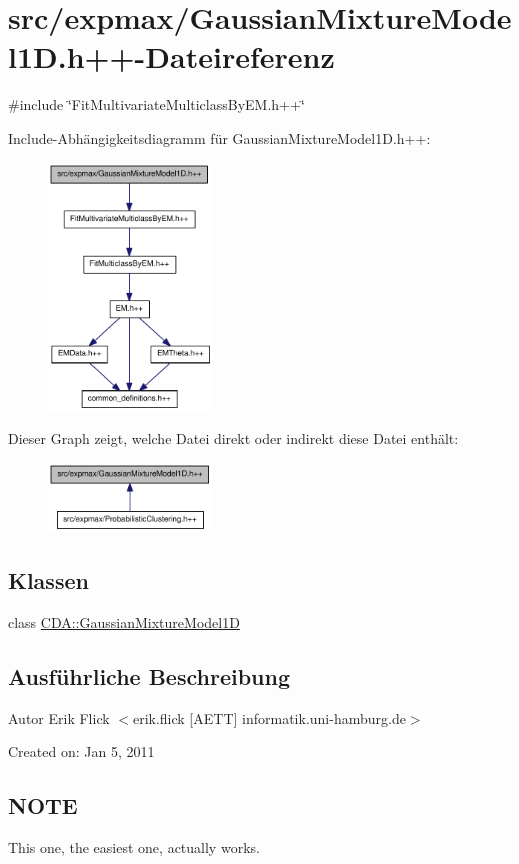 \hypertarget{GaussianMixtureModel1D_8h_09_09}{
\section{src/expmax/GaussianMixtureModel1D.h++-\/Dateireferenz}
\label{GaussianMixtureModel1D_8h_09_09}
}
{\ttfamily \#include \char`\"{}FitMultivariateMulticlassByEM.h++\char`\"{}}\par
Include-\/Abhängigkeitsdiagramm für GaussianMixtureModel1D.h++:\nopagebreak
\begin{figure}[H]
\begin{center}
\leavevmode
\includegraphics[width=124pt]{GaussianMixtureModel1D_8h_09_09__incl}
\end{center}
\end{figure}
Dieser Graph zeigt, welche Datei direkt oder indirekt diese Datei enthält:\nopagebreak
\begin{figure}[H]
\begin{center}
\leavevmode
\includegraphics[width=123pt]{GaussianMixtureModel1D_8h_09_09__dep__incl}
\end{center}
\end{figure}
\subsection*{Klassen}
\begin{DoxyCompactItemize}
\item 
class \hyperlink{classCDA_1_1GaussianMixtureModel1D}{CDA::GaussianMixtureModel1D}
\end{DoxyCompactItemize}


\subsection{Ausführliche Beschreibung}
\begin{DoxyAuthor}{Autor}
Erik Flick $<$erik.flick \mbox{[}AETT\mbox{]} informatik.uni-\/hamburg.de$>$
\end{DoxyAuthor}
Created on: Jan 5, 2011\hypertarget{GaussianMixtureModel1D_8h_09_09_NOTE}{}\subsection{NOTE}\label{GaussianMixtureModel1D_8h_09_09_NOTE}
This one, the easiest one, actually works. 